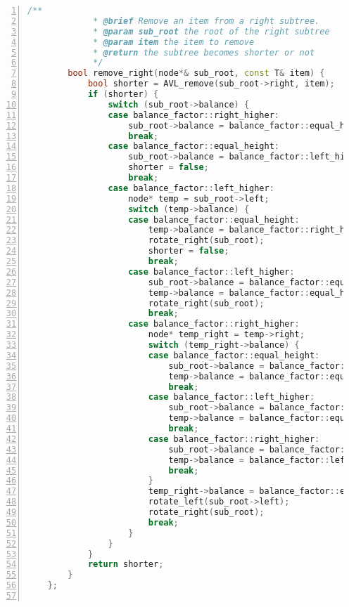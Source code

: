 \documentclass{article}
\begin{document}
\begin{lstlisting}[xleftmargin = 2em,xrightmargin = 2em, aboveskip = 0.5em, numbers = left, language = C++]
        /**
    		 * @brief Remove an item from a right subtree.
    		 * @param sub_root the root of the right subtree
    		 * @param item the item to remove
    		 * @return the subtree becomes shorter or not
    		 */
        bool remove_right(node*& sub_root, const T& item) {
            bool shorter = AVL_remove(sub_root->right, item);
            if (shorter) {
                switch (sub_root->balance) {
                case balance_factor::right_higher:
                    sub_root->balance = balance_factor::equal_height;
                    break;
                case balance_factor::equal_height:
                    sub_root->balance = balance_factor::left_higher;
                    shorter = false;
                    break;
                case balance_factor::left_higher:
                    node* temp = sub_root->left;
                    switch (temp->balance) {
                    case balance_factor::equal_height:
                        temp->balance = balance_factor::right_higher;
                        rotate_right(sub_root);
                        shorter = false;
                        break;
                    case balance_factor::left_higher:
                        sub_root->balance = balance_factor::equal_height;
                        temp->balance = balance_factor::equal_height;
                        rotate_right(sub_root);
                        break;
                    case balance_factor::right_higher:
                        node* temp_right = temp->right;
                        switch (temp_right->balance) {
                        case balance_factor::equal_height:
                            sub_root->balance = balance_factor::equal_height;
                            temp->balance = balance_factor::equal_height;
                            break;
                        case balance_factor::left_higher:
                            sub_root->balance = balance_factor::right_higher;
                            temp->balance = balance_factor::equal_height;
                            break;
                        case balance_factor::right_higher:
                            sub_root->balance = balance_factor::equal_height;
                            temp->balance = balance_factor::left_higher;
                            break;
                        }
                        temp_right->balance = balance_factor::equal_height;
                        rotate_left(sub_root->left);
                        rotate_right(sub_root);
                        break;
                    }
                }
            }
            return shorter;
        }
    };


\end{lstlisting}
\end{document}

